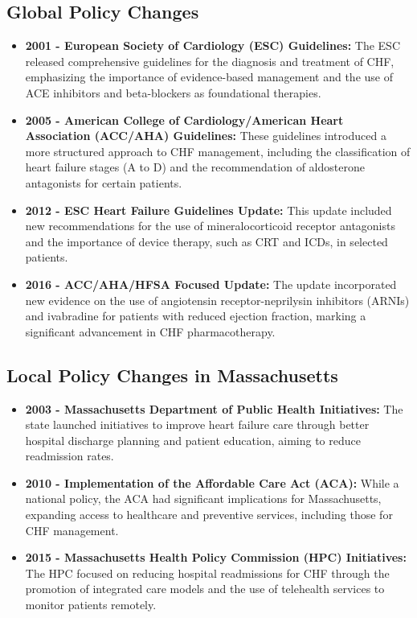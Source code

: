 \documentclass{article}
\begin{document}
\subsection{Global Policy Changes}

\begin{itemize}
    \item \textbf{2001 - European Society of Cardiology (ESC) Guidelines:} The ESC released comprehensive guidelines for the diagnosis and treatment of CHF, emphasizing the importance of evidence-based management and the use of ACE inhibitors and beta-blockers as foundational therapies.
    \item \textbf{2005 - American College of Cardiology/American Heart Association (ACC/AHA) Guidelines:} These guidelines introduced a more structured approach to CHF management, including the classification of heart failure stages (A to D) and the recommendation of aldosterone antagonists for certain patients.
    \item \textbf{2012 - ESC Heart Failure Guidelines Update:} This update included new recommendations for the use of mineralocorticoid receptor antagonists and the importance of device therapy, such as CRT and ICDs, in selected patients.
    \item \textbf{2016 - ACC/AHA/HFSA Focused Update:} The update incorporated new evidence on the use of angiotensin receptor-neprilysin inhibitors (ARNIs) and ivabradine for patients with reduced ejection fraction, marking a significant advancement in CHF pharmacotherapy.
\end{itemize}

\subsection{Local Policy Changes in Massachusetts}

\begin{itemize}
    \item \textbf{2003 - Massachusetts Department of Public Health Initiatives:} The state launched initiatives to improve heart failure care through better hospital discharge planning and patient education, aiming to reduce readmission rates.
    \item \textbf{2010 - Implementation of the Affordable Care Act (ACA):} While a national policy, the ACA had significant implications for Massachusetts, expanding access to healthcare and preventive services, including those for CHF management.
    \item \textbf{2015 - Massachusetts Health Policy Commission (HPC) Initiatives:} The HPC focused on reducing hospital readmissions for CHF through the promotion of integrated care models and the use of telehealth services to monitor patients remotely.
\end{itemize}
\end{document}
